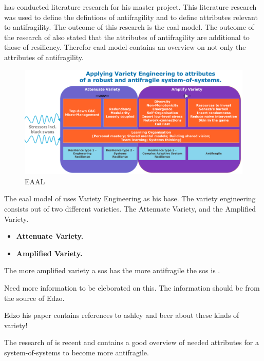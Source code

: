 \textcite{Botjes2020} has conducted literature research for his master project. This literature research was used to define the defintions of \gls{antifragility} and to define attributes relevant to \gls{antifragility}. The outcome of this research is the \acrfull{eaal} model. The outcome of the research of \textcite{Botjes2020} also stated that the attributes of \gls{antifragility} are additional to those of \gls{resiliency}. Therefor \acrshort{eaal} model contains an overview on not only the attributes of \gls{antifragility}.

\begin{figure}[H]
	\centering
	\includegraphics[width=0.7\linewidth]{images/eaal}
	\caption[EAAL]{EAAL \parencite{Botjes2020}}
	\label{fig:eaal}
\end{figure}

The \acrshort{eaal} model of \parencite{Botjes2020} uses Variety Engineering \needsref as his base. The variety engineering consists out of two different varieties. The Attenuate Variety, and the Amplified Variety.

\begin{itemize}
	\item{\textbf{Attenuate Variety.}}
	\item{\textbf{Amplified Variety.}}
\end{itemize}

The more amplified variety a \acrshort{sos} has the more antifragile the \acrshort{sos} is \needsref.

\begin{remark}
	Need more information to be eleborated on this. The information should be from the source of Edzo.
	
	Edzo his paper contains references to ashley and beer about these kinds of variety!
	
\end{remark}

The research of \textcite{Botjes2020} is recent and contains a good overview of needed attributes for a system-of-systems to become more \gls{antifragile}.

